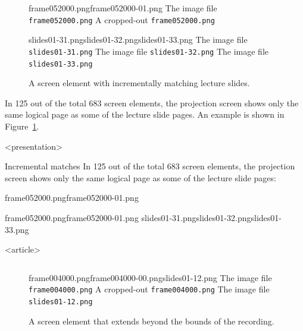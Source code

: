 \begin{description}
  \begin{figure}
    \inputminted{xml}{fig/examples/incremental/example.xml}\par
      {frame052000.png}{frame052000-01.png}%
      {The image file \texttt{frame052000.png}}%
      {A cropped-out \texttt{frame052000.png}}\par
      {slides01-31.png}{slides01-32.png}{slides01-33.png}%
      {The image file \texttt{slides01-31.png}}%
      {The image file \texttt{slides01-32.png}}%
      {The image file \texttt{slides01-33.png}}
    \caption{A screen element with incrementally matching lecture slides.}
    \label{fig:example-incremental}
  \end{figure}
  \item[Incremental matches] In 125 out of the total 683 screen elements,
    the projection screen shows only the same logical page as some of the
    lecture slide pages. An example is shown in
    Figure~\ref{fig:example-incremental}.

\mode
<presentation>

  \begin{frame}{Incremental matches}
    In 125 out of the total 683 screen elements,
    the projection screen shows only the same logical page as some of the
    lecture slide pages:

      {frame052000.png}{frame052000-01.png}%
  \end{frame}
  \begin{frame}[plain]
      {frame052000.png}{frame052000-01.png}%
      {slides01-31.png}{slides01-32.png}{slides01-33.png}%
  \end{frame}

\mode
<article>

  \begin{figure}
    \inputminted{xml}{fig/examples/beyond-bounds/example.xml}\par
      {frame004000.png}{frame004000-00.png}{slides01-12.png}%
      {The image file \texttt{frame004000.png}}%
      {A cropped-out \texttt{frame004000.png}}%
      {The image file \texttt{slides01-12.png}}
    \caption{A screen element that extends beyond the bounds of the recording.}
    \label{fig:example-beyond-bounds}


\end{figure}
\end{description}
